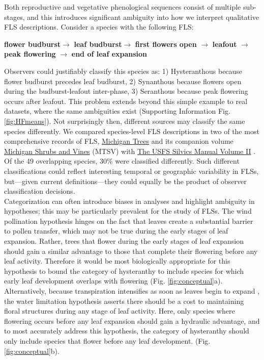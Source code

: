 \documentclass[11pt]{article}
\begin{document}
\noindent Both reproductive and vegetative phenological sequences consist of multiple sub-stages, and this introduces significant ambiguity into how we interpret qualitative FLS descriptions. Consider a species with the following FLS:\\

\begin{center}
\textbf{flower budburst}$\rightarrow$ \textbf{leaf budburst}$\rightarrow$ \textbf{first flowers open} $\rightarrow$ \textbf{leafout} $\rightarrow$ \textbf{peak flowering} $\rightarrow$ \textbf{end of leaf expansion} \\
\end{center}

\noindent Observers could justifiably classify this species as: 1) Hysteranthous because flower budburst precedes leaf budburst, 2) Synanthous because flowers open during the budburst-leafout inter-phase, 3) Seranthous because peak flowering occurs after leafout. This problem extends beyond this simple example to real datasets, \citep[e.g.][]{OKeefe2015} where the same ambiguities exist (Supporting Information Fig. \ref{fig:HFmeans}). Not surprisingly then, different sources may classify the same species differently. We compared species-level FLS descriptions in two of the most comprehensive records of FLS, \underline{Michigan Trees} and its companion volume \underline{Michigan Shrubs and Vines} (MTSV) \citep{Barnes2004,Barnes2016} with \underline{The USFS Silvics Manual Volume II} \citep{Burns1990}. Of the 49 overlapping species, 30\% were classified differently. Such different classifications could reflect interesting temporal or geographic variability in FLSs, but---given current definitions---they could equally be the product of observer classification decisions.\\

\noindent Categorization can often introduce biases in analyses \citep{Edwards2015} and highlight ambiguity in hypotheses; this may be particularly prevalent for the study of FLSs. The wind pollination hypothesis hinges on the fact that leaves create a substantial barrier to pollen transfer, which may not be true during the early stages of leaf expansion. Rather, trees that flower during the early stages of leaf expansion should gain a similar advantage to those that complete their flowering before any leaf activity. Therefore it would be most biologically appropriate for this hypothesis to bound the category of hysteranthy to include species for which early leaf development overlaps with flowering (Fig. \ref{fig:conceptual}a). Alternatively, because transpiration intensifies as soon as leaves begin to expand \citep{%
Wang2018}, the water limitation hypothesis asserts there should be a cost to maintaining floral structures during any stage of leaf activity. Here, only species where flowering occurs before any leaf expansion should gain a hydraulic advantage, and to most accurately address this hypothesis, the category of hysteranthy should only include species that flower before any leaf development. (Fig. \ref{fig:conceptual}b).\\ 
\end{document}
